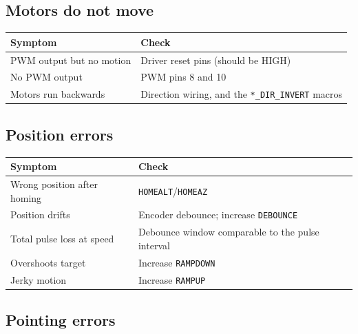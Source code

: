 \documentclass[11pt,a4paper]{article}
\begin{document}
\subsection{Motors do not move}

\begin{table}[H]
\centering
\small
\begin{tabular}{p{5.4cm}p{9.2cm}}
\toprule
\textbf{Symptom} & \textbf{Check} \\
\midrule
PWM output but no motion & Driver reset pins (should be HIGH) \\
No PWM output & PWM pins 8 and 10 \\
Motors run backwards & Direction wiring, and the \texttt{*\_DIR\_INVERT} macros \\
\bottomrule
\end{tabular}
\end{table}

\subsection{Position errors}

\begin{table}[H]
\centering
\small
\begin{tabular}{p{5.4cm}p{9.2cm}}
\toprule
\textbf{Symptom} & \textbf{Check} \\
\midrule
Wrong position after homing & \texttt{HOMEALT}/\texttt{HOMEAZ} \\
Position drifts & Encoder debounce; increase \texttt{DEBOUNCE} \\
Total pulse loss at speed & Debounce window comparable to the pulse interval \\
Overshoots target & Increase \texttt{RAMPDOWN} \\
Jerky motion & Increase \texttt{RAMPUP} \\
\bottomrule
\end{tabular}
\end{table}

\subsection{Pointing errors}
\end{document}
